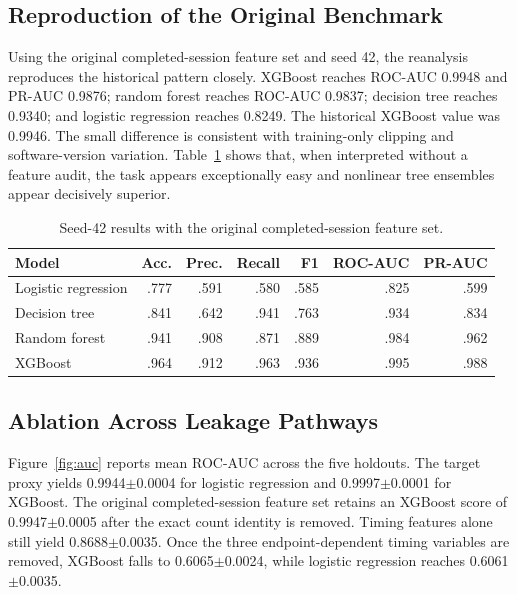 \documentclass[conference, letterpaper]{IEEEtran}
\begin{document}
\subsection{Reproduction of the Original Benchmark}
Using the original completed-session feature set and seed 42, the reanalysis reproduces the historical pattern closely. XGBoost reaches ROC-AUC 0.9948 and PR-AUC 0.9876; random forest reaches ROC-AUC 0.9837; decision tree reaches 0.9340; and logistic regression reaches 0.8249. The historical XGBoost value was 0.9946. The small difference is consistent with training-only clipping and software-version variation. Table~\ref{tab:original} shows that, when interpreted without a feature audit, the task appears exceptionally easy and nonlinear tree ensembles appear decisively superior.
\begin{table}[t]
\caption{Seed-42 results with the original completed-session feature set.}
\label{tab:original}
\centering
\scriptsize
\begin{tabular}{lrrrrrr}
\toprule
Model & Acc. & Prec. & Recall & F1 & ROC-AUC & PR-AUC \\
\midrule
Logistic regression & .777 & .591 & .580 & .585 & .825 & .599 \\
Decision tree & .841 & .642 & .941 & .763 & .934 & .834 \\
Random forest & .941 & .908 & .871 & .889 & .984 & .962 \\
XGBoost & .964 & .912 & .963 & .936 & .995 & .988 \\
\bottomrule
\end{tabular}
\end{table}

\subsection{Ablation Across Leakage Pathways}
\label{sec:ablation}
Figure~\ref{fig:auc} reports mean ROC-AUC across the five holdouts. The target proxy yields 0.9944$\pm$0.0004 for logistic regression and 0.9997$\pm$0.0001 for XGBoost. The original completed-session feature set retains an XGBoost score of 0.9947$\pm$0.0005 after the exact count identity is removed. Timing features alone still yield 0.8688$\pm$0.0035. Once the three endpoint-dependent timing variables are removed, XGBoost falls to 0.6065$\pm$0.0024, while logistic regression reaches 0.6061$\pm$0.0035.
\end{document}
